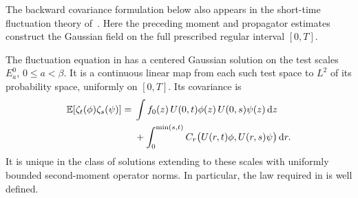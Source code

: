 The backward covariance formulation below also appears in the short-time
fluctuation theory of~\cite[Section~6.1]{BGSS2023}.  Here the preceding
moment and propagator estimates construct the Gaussian field on the full
prescribed regular interval \([0,T]\).

\begin{proposition}\label{prop:gaussian-target}
The fluctuation equation in  has a centered Gaussian
solution on the test scales $E_a^0$, $0\le a<\beta$.  It is a
continuous linear map from each such test space to $L^2$ of its
probability space, uniformly on $[0,T]$.  Its covariance is
\begin{equation}\label{eq:target-covariance}
 \begin{split}
 \mathbb E[\zeta_t(\phi)\zeta_s(\psi)]
 ={}&\int f_0(z)\,U(0,t)\phi(z)\,U(0,s)\psi(z)\,\mathrm d z\\
 &+\int_0^{\min(s,t)}
     C_r\bigl(U(r,t)\phi,U(r,s)\psi\bigr)\,\mathrm d r.
 \end{split}
\end{equation}
It is unique in the class of solutions extending to these scales
with uniformly bounded second-moment operator norms.  In particular,
the law required in  is well defined.
\end{proposition}

